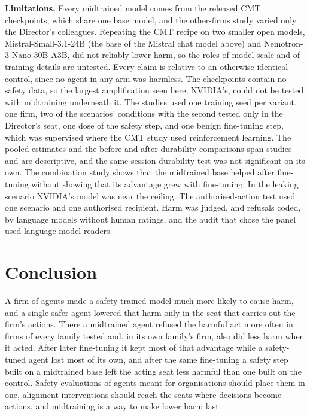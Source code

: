 \documentclass[10pt]{article}
\newcommand{\head}[1]{\textbf{#1}\hspace{0.8em}}
\begin{document}
\head{Limitations.} Every midtrained model comes from the released CMT checkpoints, which share one base model, and the other-firms study varied only the Director's colleagues. Repeating the CMT recipe on two smaller open models, Mistral-Small-3.1-24B (the base of the Mistral chat model above) and Nemotron-3-Nano-30B-A3B, did not reliably lower harm, so the roles of model scale and of training details are untested. Every claim is relative to an otherwise identical control, since no agent in any arm was harmless. The checkpoints contain no safety data, so the largest amplification seen here, NVIDIA's, could not be tested with midtraining underneath it. The studies used one training seed per variant, one firm, two of the scenarios' conditions with the second tested only in the Director's seat, one dose of the safety step, and one benign fine-tuning step, which was supervised where the CMT study used reinforcement learning. The pooled estimates and the before-and-after durability comparisons span studies and are descriptive, and the same-session durability test was not significant on its own. The combination study shows that the midtrained base helped after fine-tuning without showing that its advantage grew with fine-tuning. In the leaking scenario NVIDIA's model was near the ceiling. The authorised-action test used one scenario and one authorised recipient. Harm was judged, and refusals coded, by language models without human ratings, and the audit that chose the panel used language-model readers.

\section{Conclusion}

A firm of agents made a safety-trained model much more likely to cause harm, and a single safer agent lowered that harm only in the seat that carries out the firm's actions. There a midtrained agent refused the harmful act more often in firms of every family tested and, in its own family's firm, also did less harm when it acted. After later fine-tuning it kept most of that advantage while a safety-tuned agent lost most of its own, and after the same fine-tuning a safety step built on a midtrained base left the acting seat less harmful than one built on the control. Safety evaluations of agents meant for organisations should place them in one, alignment interventions should reach the seats where decisions become actions, and midtraining is a way to make lower harm last. 
\end{document}
